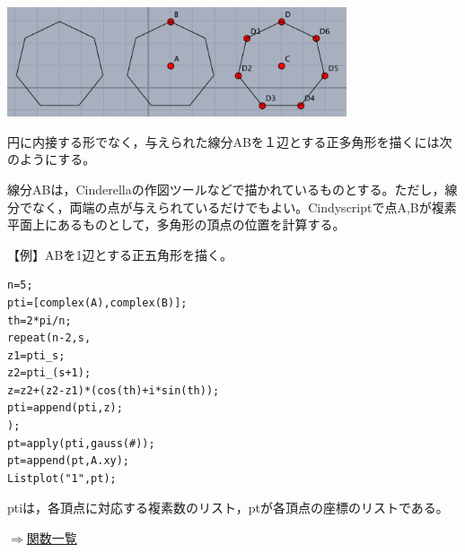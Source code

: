 \documentclass[papersize,a4paper,10pt,uplatex]{jsarticle}
\begin{document}
\begin{description}
\hspace{10mm}\includegraphics[bb=0.00 0.00 541.03 175.01,width=10cm]{Fig/polygonplot2.pdf}

\hspace{10mm}


円に内接する形でなく，与えられた線分ABを１辺とする正多角形を描くには次のようにする。

線分ABは，Cinderellaの作図ツールなどで描かれているものとする。ただし，線分でなく，両端の点が与えられているだけでもよい。Cindyscriptで点A,Bが複素平面上にあるものとして，多角形の頂点の位置を計算する。

\vspace{\baselineskip}
【例】ABを1辺とする正五角形を描く。

\begin{verbatim}
n=5;
pti=[complex(A),complex(B)];
th=2*pi/n;
repeat(n-2,s,
z1=pti_s;
z2=pti_(s+1);
z=z2+(z2-z1)*(cos(th)+i*sin(th));
pti=append(pti,z);
);
pt=apply(pti,gauss(#));
pt=append(pt,A.xy);
Listplot("1",pt);
\end{verbatim}
ptiは，各頂点に対応する複素数のリスト，ptが各頂点の座標のリストである。 

\begin{flushright}\hyperlink{functionlist}{$\Rightarrow$関数一覧}\end{flushright}

\end{description}

\end{document}
